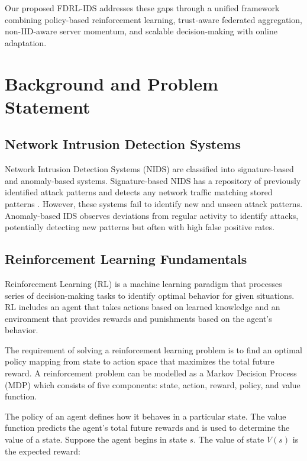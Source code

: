 \documentclass[conference]{IEEEtran}
\begin{document}
Our proposed FDRL-IDS addresses these gaps through a unified framework combining policy-based reinforcement learning, trust-aware federated aggregation, non-IID-aware server momentum, and scalable decision-making with online adaptation.

\section{Background and Problem Statement}

\subsection{Network Intrusion Detection Systems}

Network Intrusion Detection Systems (NIDS) are classified into signature-based and anomaly-based systems. Signature-based NIDS has a repository of previously identified attack patterns and detects any network traffic matching stored patterns \cite{nslkdd}. However, these systems fail to identify new and unseen attack patterns. Anomaly-based IDS observes deviations from regular activity to identify attacks, potentially detecting new patterns but often with high false positive rates.

\subsection{Reinforcement Learning Fundamentals}

Reinforcement Learning (RL) is a machine learning paradigm that processes series of decision-making tasks to identify optimal behavior for given situations. RL includes an agent that takes actions based on learned knowledge and an environment that provides rewards and punishments based on the agent's behavior.

The requirement of solving a reinforcement learning problem is to find an optimal policy mapping from state to action space that maximizes the total future reward. A reinforcement problem can be modelled as a Markov Decision Process (MDP) \cite{rl_book} which consists of five components: state, action, reward, policy, and value function.

The policy of an agent defines how it behaves in a particular state. The value function predicts the agent's total future rewards and is used to determine the value of a state. Suppose the agent begins in state $s$. The value of state $V(s)$ is the expected reward:
\end{document}
